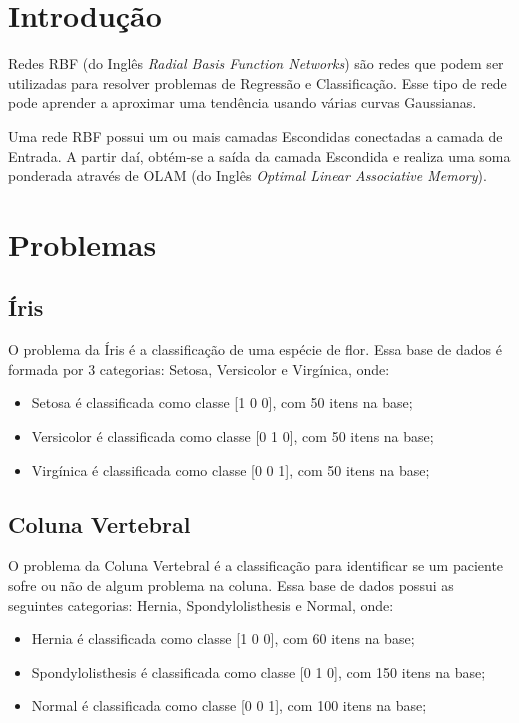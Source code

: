 \renewcommand{\figurename}{Figura}

\section{Introdução}

Redes RBF (do Inglês \emph{Radial Basis Function Networks}) são redes
que podem ser utilizadas para resolver problemas de Regressão e
Classificação. Esse tipo de rede pode aprender a aproximar uma tendência
usando várias curvas Gaussianas.

Uma rede RBF possui um ou mais camadas Escondidas conectadas a camada de
Entrada. A partir daí, obtém-se a saída da camada Escondida e realiza
uma soma ponderada através de OLAM (do Inglês \emph{Optimal Linear
Associative Memory}).

\section{Problemas}

\subsection{Íris}

O problema da Íris é a classificação de uma espécie de flor. Essa base
de dados é formada por 3 categorias: Setosa, Versicolor e Virgínica,
onde:

\begin{itemize}
\tightlist
\item
  Setosa é classificada como classe {[}1 0 0{]}, com 50 itens na base;
\item
  Versicolor é classificada como classe {[}0 1 0{]}, com 50 itens na
  base;
\item
  Virgínica é classificada como classe {[}0 0 1{]}, com 50 itens na
  base;
\end{itemize}

\subsection{Coluna Vertebral}

O problema da Coluna Vertebral é a classificação para identificar se um
paciente sofre ou não de algum problema na coluna. Essa base de dados
possui as seguintes categorias: Hernia, Spondylolisthesis e Normal,
onde:

\begin{itemize}
\tightlist
\item
  Hernia é classificada como classe {[}1 0 0{]}, com 60 itens na base;
\item
  Spondylolisthesis é classificada como classe {[}0 1 0{]}, com 150
  itens na base;
\item
  Normal é classificada como classe {[}0 0 1{]}, com 100 itens na base;
\end{itemize}

